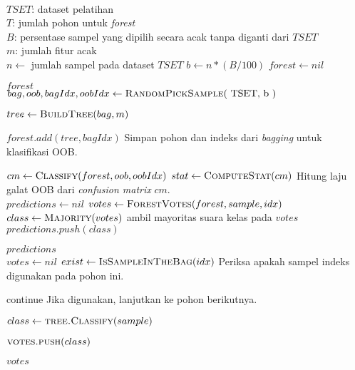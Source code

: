 \begin{center}
\label{alg:rf}
	\begin{algorithmic}[1]
\Require \\
$ TSET $: dataset pelatihan \\
$ T $: jumlah pohon untuk \textit{forest} \\
$ B $: persentase sampel yang dipilih secara acak tanpa diganti dari $TSET$ \\
$ m $: jumlah fitur acak \\

	\State $ n \gets $ jumlah sampel pada dataset $ TSET $
	\State $ b \gets n * (B / 100) $
	\State $ forest \gets nil $
		\State {}
	\EndFor
	
	\State \Return $forest$
\EndFunction
\\
	\label{bagging}
	\State $ bag, oob, bagIdx, oobIdx \gets \Call{RandomPickSample}{$ TSET,
	b $} $

	\State $ tree \gets \Call{BuildTree}{bag, m} $

	\State $ forest.add(tree, bagIdx) $
	\Comment Simpan pohon dan indeks dari \textit{bagging} untuk
	klasifikasi OOB.

	\State $ cm \gets \Call{Classify}{forest, oob, oobIdx} $
	\State $ stat \gets \Call{ComputeStat}{cm} $
	\Comment Hitung laju galat OOB dari \textit{confusion matrix}
	$cm$.
\EndFunction
\\
	\State $ predictions \gets nil $
		\State $ votes \gets \Call{ForestVotes}{forest, sample, idx} $
		\State $ class \gets \Call{Majority}{votes} $
		\Comment ambil mayoritas suara kelas pada $votes$
		\State $ predictions.push(class) $
	\EndFor

	\State \Return $predictions$
\EndFunction
\\
	\State $ votes \gets nil $
		\State $ exist \gets \Call{IsSampleInTheBag}{idx} $
		\Comment Periksa apakah sampel indeks digunakan pada pohon ini.

			\State continue
			\Comment Jika digunakan, lanjutkan ke pohon berikutnya.
		\EndIf

		\State $ class \gets \Call{tree.Classify}{sample} $

		\State $ \Call{votes.push}{class} $
	\EndFor

	\State \Return $ votes $
\EndFunction
	\end{algorithmic}
\end{center}
